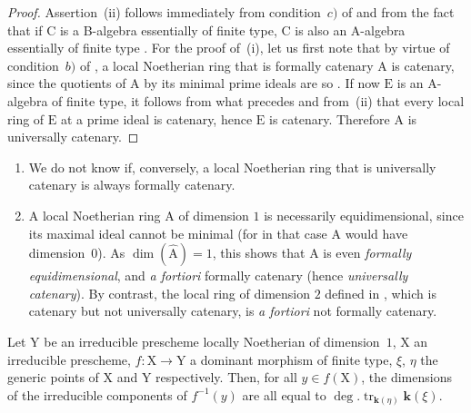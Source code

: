 \begin{proof}
Assertion~(ii) follows immediately from condition~$c)$ of  and from the fact that if $\mathrm{C}$ is a B-algebra essentially of finite type, $\mathrm{C}$ is also an A-algebra essentially of finite type .
For the proof of~(i), let us first note that by virtue of condition~$b)$ of , a local Noetherian ring that is formally catenary $\mathrm{A}$ is catenary, since the quotients of $\mathrm{A}$ by its minimal prime ideals are so .
If now $\mathrm{E}$ is an A-algebra of finite type, it follows from what precedes and from~(ii) that every local ring of $\mathrm{E}$ at a prime ideal is catenary, hence $\mathrm{E}$ is catenary.
Therefore $\mathrm{A}$ is universally catenary.
\end{proof}

\begin{remarks}[7.1.12]
\label{IV.7.1.12}
\begin{enumerate}[label=\emph{\roman*)}]
  \item We do not know if, conversely, a local Noetherian ring that is universally catenary is always formally catenary.

  \item A local Noetherian ring $\mathrm{A}$ of dimension $1$ is necessarily equidimensional, since its maximal ideal cannot be minimal (for in that case $\mathrm{A}$ would have dimension~$0$).
  As $\dim(\widehat{\mathrm{A}})=1$, this shows that $\mathrm{A}$ is even \emph{formally equidimensional}, and \emph{a fortiori} formally catenary (hence \emph{universally catenary}).
  By contrast, the local ring of dimension $2$ defined in , which is catenary but not universally catenary, is \emph{a fortiori} not formally catenary.
\end{enumerate}
\end{remarks}


\begin{corollary}[7.1.13]
\label{IV.7.1.13}
Let $\mathrm{Y}$ be an irreducible prescheme locally Noetherian of dimension~$1$, $\mathrm{X}$ an irreducible prescheme, $f:\mathrm{X}\to\mathrm{Y}$ a dominant morphism of finite type, $\xi$, $\eta$ the generic points of $\mathrm{X}$ and $\mathrm{Y}$ respectively.
Then, for all $y\in f(\mathrm{X})$, the dimensions of the irreducible components of $f^{-1}(y)$ are all equal to $\deg.\operatorname{tr}_{\boldsymbol{k}(\eta)}\boldsymbol{k}(\xi)$.
\end{corollary}

